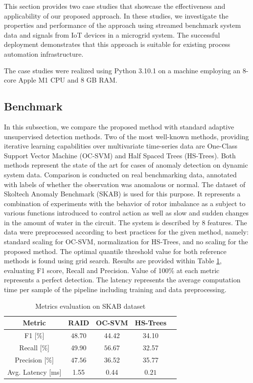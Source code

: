 This section provides two case studies that showcase the effectiveness and applicability of our proposed approach. In these studies, we investigate the properties and performance of the approach using streamed benchmark system data and signals from IoT devices in a microgrid system.  The successful deployment demonstrates that this approach is suitable for existing process automation infrastructure.

The case studies were realized using Python 3.10.1 on a machine employing an 8-core Apple M1 CPU and 8 GB RAM.

\subsection{Benchmark}\label{AA:Benchmark}
In this subsection, we compare the proposed method with standard adaptive unsupervised detection methods. Two of the most well-known methods, providing iterative learning capabilities over multivariate time-series data are One-Class Support Vector Machine (OC-SVM) and Half Spaced Trees (HS-Trees). Both methods represent the state of the art for cases of anomaly detection on dynamic system data. Comparison is conducted on real benchmarking data, annotated with labels of whether the observation was anomalous or normal. The dataset of Skoltech Anomaly Benchmark (SKAB) \cite{skab2020} is used for this purpose. It represents a combination of experiments with the behavior of rotor imbalance as a subject to various functions introduced to control action as well as slow and sudden changes in the amount of water in the circuit. The system is described by 8 features. The data were preprocessed according to best practices for the given method, namely: standard scaling for OC-SVM, normalization for HS-Trees, and no scaling for the proposed method. The optimal quantile threshold value for both reference methods is found using grid search. Results are provided within Table \ref{tab:perf_comp}, evaluating F1 score, Recall and Precision. Value of 100\% at each metric represents a perfect detection. The latency represents the average computation time per sample of the pipeline including training and data preprocessing.

\begin{table}[htbp]
  \caption{Metrics evaluation on SKAB dataset}
  \begin{center}
  \label{tab:perf_comp}
  \begin{tabular}{|c|c|c|c|c|}
    \hline
    Metric & RAID & OC-SVM & HS-Trees \\
    \hline
    F1 [$\%$] & $\boldsymbol{48.70}$ & 44.42 & 34.10 \\
    \hline
    Recall [$\%$] & 49.90 & $\boldsymbol{56.67}$ & 32.57 \\
    \hline
    Precision [$\%$] & $\boldsymbol{47.56}$ & 36.52 & 35.77 \\
    \hline
    Avg. Latency [ms] & 1.55 & 0.44 & $\boldsymbol{0.21}$ \\
    \hline
  \end{tabular}
  \end{center}
\end{table}


